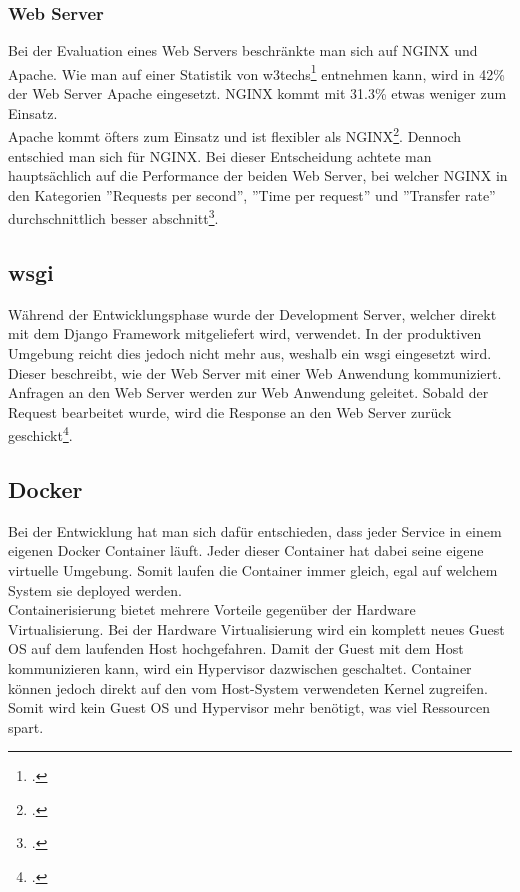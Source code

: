 \subsubsection*{Web Server}
Bei der Evaluation eines Web Servers beschränkte man sich auf NGINX und Apache. Wie man auf einer Statistik von w3techs\footcite{webserver_usage} entnehmen kann, wird in 42\% der Web Server Apache eingesetzt. NGINX kommt mit 31.3\% etwas weniger zum Einsatz. \\

Apache kommt öfters zum Einsatz und ist flexibler als NGINX\footcite{webserver_comparison}. Dennoch entschied man sich für NGINX. Bei dieser Entscheidung achtete man hauptsächlich auf die Performance der beiden Web Server, bei welcher NGINX in den Kategorien ''Requests per second'', ''Time per request'' und ''Transfer rate'' durchschnittlich besser abschnitt\footcite{webserver_performance}.

\subsection*{\gls{wsgi}}
Während der Entwicklungsphase wurde der Development Server, welcher direkt mit dem Django Framework mitgeliefert wird, verwendet. In der produktiven Umgebung reicht dies jedoch nicht mehr aus, weshalb ein \gls{wsgi} eingesetzt wird. Dieser beschreibt, wie der Web Server mit einer Web Anwendung kommuniziert. Anfragen an den Web Server werden zur Web Anwendung geleitet. Sobald der Request bearbeitet wurde, wird die Response an den Web Server zurück geschickt\footcite{wsgi_description}.

\subsection*{Docker}
Bei der Entwicklung hat man sich dafür entschieden, dass jeder Service in einem eigenen Docker Container läuft. Jeder dieser Container hat dabei seine eigene virtuelle Umgebung. Somit laufen die Container immer gleich, egal auf welchem System sie deployed werden. \\

Containerisierung bietet mehrere Vorteile gegenüber der Hardware Virtualisierung. Bei der Hardware Virtualisierung wird ein komplett neues Guest OS auf dem laufenden Host hochgefahren. Damit der Guest mit dem Host kommunizieren kann, wird ein Hypervisor dazwischen geschaltet. Container können jedoch direkt auf den vom Host-System verwendeten Kernel zugreifen. Somit wird kein Guest OS und Hypervisor mehr benötigt, was viel Ressourcen spart. \\

